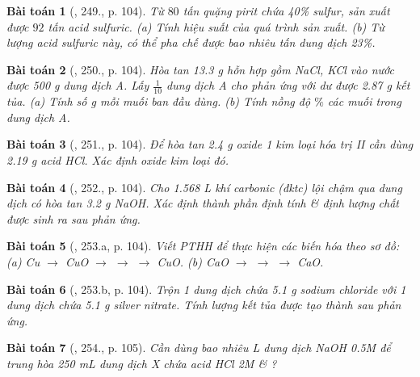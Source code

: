 \documentclass{article}
\newtheorem{baitoan}{Bài toán}
\begin{document}
\begin{baitoan}[\cite{Nguyen_Buu_Can_500_BT_Hoa_Hoc_THCS}, 249., p. 104]
	Từ $80$ tấn quặng pirit chứa {\rm40\%} sulfur, sản xuất được $92$ tấn acid sulfuric. (a) Tính hiệu suất của quá trình sản xuất. (b) Từ lượng acid sulfuric này, có thể pha chế được bao nhiêu tấn dung dịch {\rm{} 23\%}.
\end{baitoan}

\begin{baitoan}[\cite{Nguyen_Buu_Can_500_BT_Hoa_Hoc_THCS}, 250., p. 104]
	Hòa tan {\rm13.3 g} hỗn hợp gồm {\rm NaCl, KCl} vào nước được {\rm500 g} dung dịch A. Lấy $\frac{1}{10}$ dung dịch A cho phản ứng với {\rm{}} dư được {\rm2.87 g} kết tủa. (a) Tính số {\rm g} mỗi muối ban đầu dùng. (b) Tính nồng độ $\%$ các muối trong dung dịch A.
\end{baitoan}

\begin{baitoan}[\cite{Nguyen_Buu_Can_500_BT_Hoa_Hoc_THCS}, 251., p. 104]
	Để hòa tan {\rm2.4 g} oxide 1 kim loại hóa trị {\rm II} cần dùng {\rm2.19 g} acid {\rm HCl}. Xác định oxide kim loại đó.
\end{baitoan}

\begin{baitoan}[\cite{Nguyen_Buu_Can_500_BT_Hoa_Hoc_THCS}, 252., p. 104]
	Cho {\rm1.568 L} khí carbonic (đktc) lội chậm qua dung dịch có hòa tan {\rm3.2 g NaOH}. Xác định thành phần định tính \& định lượng chất được sinh ra sau phản ứng.
\end{baitoan}

\begin{baitoan}[\cite{Nguyen_Buu_Can_500_BT_Hoa_Hoc_THCS}, 253.a, p. 104]
	Viết {\rm PTHH} để thực hiện các biến hóa theo sơ đồ: {\rm(a) Cu $\to$ CuO $\to$  $\to$  $\to$ CuO. (b) CaO $\to$  $\to$  $\to$ CaO}.
\end{baitoan}

\begin{baitoan}[\cite{Nguyen_Buu_Can_500_BT_Hoa_Hoc_THCS}, 253.b, p. 104]
	Trộn 1 dung dịch chứa {\rm5.1 g} sodium chloride với 1 dung dịch chứa {\rm5.1 g} silver nitrate. Tính lượng kết tủa được tạo thành sau phản ứng.
\end{baitoan}

\begin{baitoan}[\cite{Nguyen_Buu_Can_500_BT_Hoa_Hoc_THCS}, 254., p. 105]
	Cần dùng bao nhiêu {\rm L} dung dịch {\rm NaOH 0.5M} để trung hòa {\rm250 mL} dung dịch X chứa acid {\rm HCl 2M \& }?
\end{baitoan}
\end{document}
